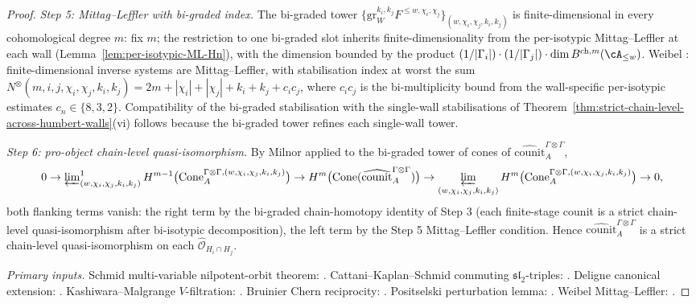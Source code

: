 \begin{proof}
\emph{Step 5: Mittag--Leffler with bi-graded index.} The bi-graded
tower
$\{\mathrm{gr}^{k_i,k_j}_W F^{\leq w,\chi_i,\chi_j}\}_{(w,\chi_i,\chi_j,k_i,k_j)}$
is finite-dimensional in every cohomological degree $m$: fix $m$; the
restriction to one bi-graded slot inherits finite-dimensionality from
the per-isotypic Mittag--Leffler at each wall
(Lemma~\textup{\ref{lem:per-isotypic-ML-Hn}}), with the dimension
bounded by the product
$(1/|\Gamma_i|)\cdot(1/|\Gamma_j|)\cdot\dim B^{\mathrm{ch},m}(\cA_{\leq w})$.
Weibel \cite[Prop.~3.5.7]{Weibel94}: finite-dimensional inverse
systems are Mittag--Leffler, with stabilisation index at worst the
sum
$N^{\otimes}(m,i,j,\chi_i,\chi_j,k_i,k_j)
=2m+|\chi_i|+|\chi_j|+k_i+k_j+c_ic_j$,
where $c_ic_j$ is the bi-multiplicity bound from the wall-specific
per-isotypic estimates $c_n\in\{8,3,2\}$. Compatibility of the
bi-graded stabilisation with the single-wall stabilisations of
Theorem~\textup{\ref{thm:strict-chain-level-across-humbert-walls}}(vi)
follows because the bi-graded tower refines each single-wall tower.

\emph{Step 6: pro-object chain-level quasi-isomorphism.} By Milnor
applied to the bi-graded tower of cones of
$\widehat{\mathrm{counit}}^{\Gamma\otimes\Gamma}_A$,
\[
0
\to \varprojlim\nolimits^1_{(w,\chi_i,\chi_j,k_i,k_j)}
H^{m-1}\bigl(\mathrm{Cone}^{\Gamma\otimes\Gamma,(w,\chi_i,\chi_j,k_i,k_j)}_A\bigr)
\to H^m\bigl(\mathrm{Cone}(\widehat{\mathrm{counit}}^{\Gamma\otimes\Gamma}_A)\bigr)
\to
\varprojlim_{(w,\chi_i,\chi_j,k_i,k_j)}
H^m\bigl(\mathrm{Cone}^{\Gamma\otimes\Gamma,(w,\chi_i,\chi_j,k_i,k_j)}_A\bigr)
\to 0,
\]
both flanking terms vanish: the right term by the bi-graded
chain-homotopy identity of Step 3 (each finite-stage counit is a
strict chain-level quasi-isomorphism after bi-isotypic decomposition),
the left term by the Step 5 Mittag--Leffler condition. Hence
$\widehat{\mathrm{counit}}^{\Gamma\otimes\Gamma}_A$ is a strict
chain-level quasi-isomorphism on each $\widehat{\mathcal{O}}_{H_i\cap H_j}$.

\emph{Primary inputs.} Schmid multi-variable nilpotent-orbit theorem:
\cite[Thm.~4.9]{Schmid1973}. Cattani--Kaplan--Schmid commuting
$\mathfrak{sl}_2$-triples: \cite[\S 2.1]{CattaniKaplanSchmid1986}.
Deligne canonical extension: \cite[\S 5]{Deligne1970}.
Kashiwara--Malgrange $V$-filtration: \cite{Kashiwara1983,Malgrange1983}.
Bruinier Chern reciprocity: \cite[Prop.~5.1]{Bruinier2002LNM}.
Positselski perturbation lemma: \cite[\S\S 3--4]{Positselski11}.
Weibel Mittag--Leffler: \cite[Prop.~3.5.7]{Weibel94}.
\end{proof}

